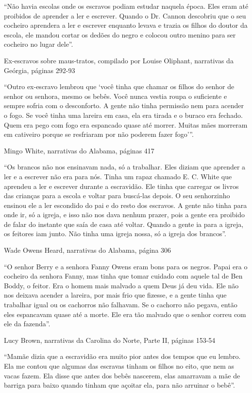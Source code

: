 ``Não havia escolas onde os escravos podiam estudar naquela época. Eles
eram até proibidos de aprender a ler e escrever. Quando o Dr. Cannon
descobriu que o seu cocheiro aprendera a ler e escrever enquanto levava
e trazia os filhos do doutor da escola, ele mandou cortar os dedões do
negro e colocou outro menino para ser cocheiro no lugar dele''.

Ex-escravos sobre maus-tratos, compilado por Louise Oliphant, narrativas
da Geórgia, páginas 292-93

``Outro ex-escravo lembrou que `você tinha que chamar os filhos do
senhor de senhor ou senhora, mesmo os bebês. Você nunca vestia roupa o
suficiente e sempre sofria com o desconforto. A gente não tinha
permissão nem para acender o fogo. Se você tinha uma lareira em casa,
ela era tirada e o buraco era fechado. Quem era pego com fogo era
espancado quase até morrer. Muitas mães morreram em cativeiro porque se
resfriaram por não poderem fazer fogo'''.

Mingo White, narrativas do Alabama, páginas 417

``Os brancos não nos ensinavam nada, só a trabalhar. Eles diziam que
aprender a ler e a escrever não era para nós. Tinha um rapaz chamado E.
C. White que aprendeu a ler e escrever durante a escravidão. Ele tinha
que carregar os livros das crianças para a escola e voltar para
buscá-las depois. O seu senhorzinho ensinou ele a ler escondido do pai e
do resto dos escravos. A gente não tinha para onde ir, só a igreja, e
isso não nos dava nenhum prazer, pois a gente era proibido de falar do
instante que saía de casa até voltar. Quando a gente ia para a igreja,
os feitores iam junto. Não tinha uma igreja nossa, só a igreja dos
brancos''.

Wade Owens Heard, narrativas do Alabama, página 306

``O senhor Berry e a senhora Fanny Owens eram bons para os negros. Papai
era o cocheiro da senhora Fanny, mas tinha que tomar cuidado com aquele
tal de Ben Boddy, o feitor. Era o homem mais malvado a quem Deus já deu
vida. Ele não nos deixava acender a lareira, por mais frio que fizesse,
e a gente tinha que trabalhar igual ou os cachorros não falhavam. Se o
cachorro não pegava, então eles espancavam quase até a morte. Ele era
tão malvado que o senhor correu com ele da fazenda''.

Lucy Brown, narrativas da Carolina do Norte, Parte II, páginas 153-54

``Mamãe dizia que a escravidão era muito pior antes dos tempos que eu
lembro. Ela me contou que algumas das escravas tinham os filhos no eito,
que nem as vacas fazem. Ela disse que antes dos bebês nascerem, elas
amarravam a mãe de barriga para baixo quando tinham que açoitar ela,
para não arruinar o bebê''.

